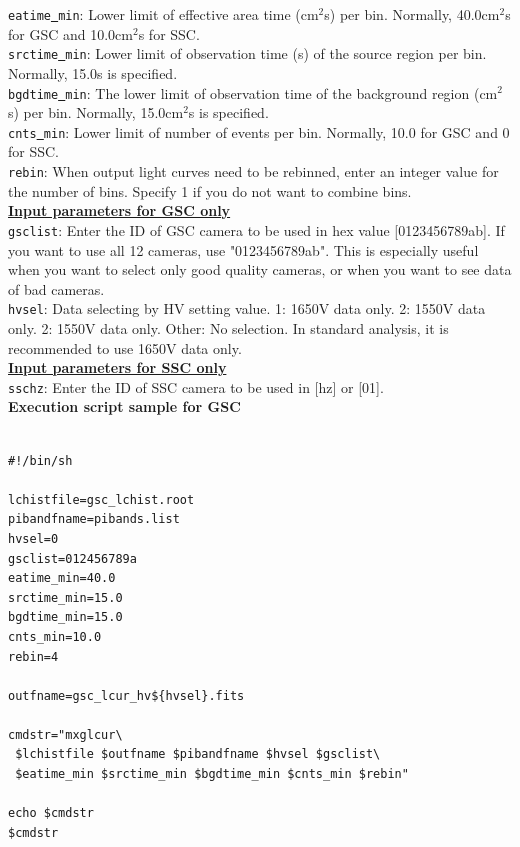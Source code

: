 \documentclass[10pt]{report}
\renewcommand{\_}{\textscale{.5}{\textbf{\textunderscore}}}
\begin{document}
\noindent\texttt{eatime\underline{ }min}: Lower limit of effective area time (cm$^2$s) per bin. Normally, 40.0cm$^2$s for GSC and 10.0cm$^2$s for SSC. \\

\noindent\texttt{srctime\underline{ }min}: Lower limit of observation time (s) of the source region per bin. Normally, 15.0s is specified.\\

\noindent\texttt{bgdtime\underline{ }min}: The lower limit of observation time of the background region (cm$^2$s) per bin. Normally, 15.0cm$^2$s is specified.\\

\noindent\texttt{cnts\underline{ }min}: Lower limit of number of events per bin. Normally, 10.0 for GSC and 0 for SSC. \\

\noindent\texttt{rebin}: When output light curves need to be rebinned, enter an integer value for the number of bins. Specify 1 if you do not want to combine bins. \\

\noindent\underline{\textbf{Input parameters for GSC only}} \\

\noindent\texttt{gsclist}: Enter the ID of GSC camera to be used in hex value [0123456789ab]. If you want to use all 12 cameras, use "0123456789ab". This is especially useful when you want to select only good quality cameras, or when you want to see data of bad cameras. \\

\noindent\texttt{hvsel}: Data selecting by HV setting value. 1: 1650V data only. 2: 1550V data only. 2: 1550V data only. Other: No selection. In standard analysis, it is recommended to use 1650V data only. \\

\noindent\underline{\textbf{Input parameters for SSC only}} \\

\noindent\texttt{sschz}: Enter the ID of SSC camera to be used in [hz] or [01]. \\

\noindent\textbf{Execution script sample for GSC} \\

\begin{lstlisting}[frame=single]

#!/bin/sh

lchistfile=gsc_lchist.root
pibandfname=pibands.list
hvsel=0
gsclist=012456789a
eatime_min=40.0
srctime_min=15.0
bgdtime_min=15.0
cnts_min=10.0
rebin=4

outfname=gsc_lcur_hv${hvsel}.fits

cmdstr="mxglcur\
 $lchistfile $outfname $pibandfname $hvsel $gsclist\
 $eatime_min $srctime_min $bgdtime_min $cnts_min $rebin"
 
echo $cmdstr
$cmdstr

\end{lstlisting}
\end{document}
